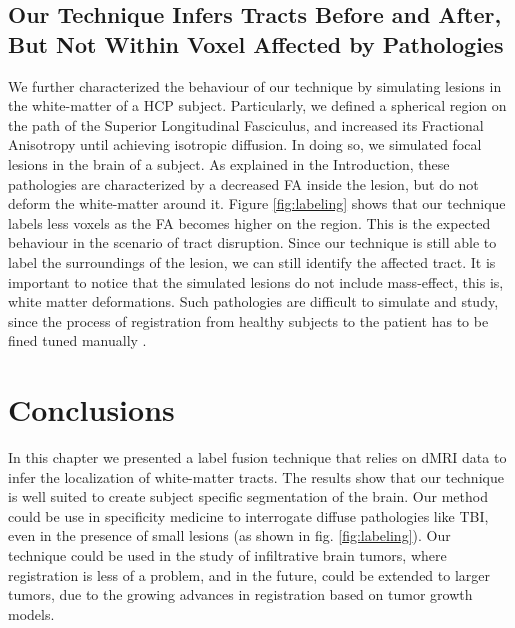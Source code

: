 \subsection{Our Technique Infers Tracts Before and After, But Not Within 
            Voxel Affected by Pathologies}
We further characterized the behaviour of our technique by simulating lesions
in the white-matter of a HCP subject. Particularly, we defined a spherical region
on the path of the Superior Longitudinal Fasciculus, and increased its
Fractional Anisotropy until achieving isotropic diffusion. In doing so, we
simulated focal lesions in the brain of a subject. As explained in the Introduction,
these pathologies are characterized by a decreased FA inside
the lesion, but do not deform the white-matter around it. Figure \ref{fig:labeling}
shows that our technique labels less voxels as the FA becomes higher on the
region. This is the expected behaviour in the scenario of tract disruption.
Since our technique
is still able to label the surroundings of the lesion, we can still identify
the affected tract. It is important to notice that the simulated lesions do not
include mass-effect, this is, white matter deformations. Such pathologies
are difficult to simulate and study, since the process of registration from
healthy subjects to the patient has to be fined tuned manually . 

\section{Conclusions}
In this chapter we presented a label fusion technique that relies on dMRI
data to infer the localization of white-matter tracts. The results show that
our technique is well suited to create subject specific segmentation of the 
brain. Our method could be use in specificity medicine to interrogate diffuse
pathologies like TBI, even in the presence of small lesions (as shown in fig. \ref{fig:labeling}).
Our technique could be used in the study of infiltrative brain tumors, where
registration is less of a problem, and in
the future, could be extended to larger tumors, due to the growing advances in
registration based on tumor growth models. 


\chapterbib
